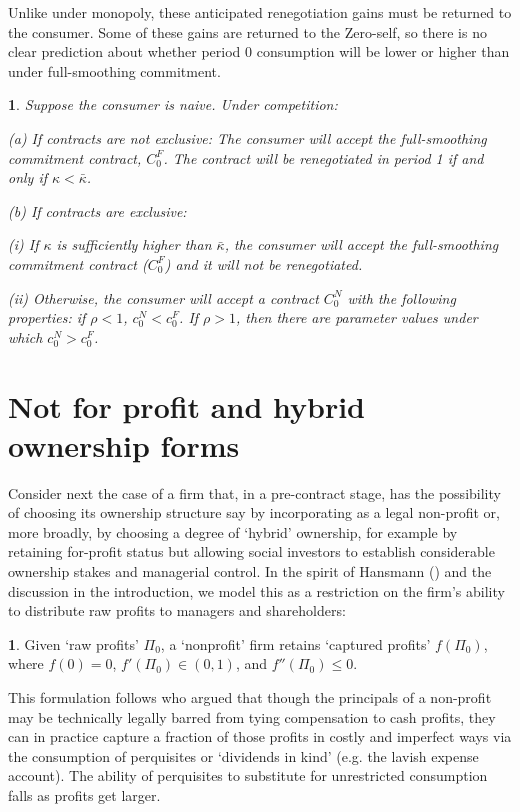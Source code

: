 \documentclass[11pt,english]{article}
\theoremstyle{plain}
\newtheorem{prop}{\protect\propositionname}
\theoremstyle{definition}
\newtheorem*{defn*}{\protect\definitionname}
\providecommand{\definitionname}{Definition}
\providecommand{\propositionname}{Proposition}
\begin{document}
Unlike under monopoly, these anticipated renegotiation gains must
be returned to the consumer. Some of these gains are returned to the
Zero-self, so there is no clear prediction about whether period 0
consumption will be lower or higher than under full-smoothing commitment.
\begin{prop}
Suppose the consumer is naive. Under competition:

(a) If contracts are not exclusive: The consumer will accept the full-smoothing
commitment contract, $C_{0}^{F}$. The contract will be renegotiated
in period 1 if and only if $\kappa<\bar{\kappa}$.

(b) If contracts are exclusive: 

(i) If $\kappa$ is sufficiently higher than $\bar{\kappa}$, the
consumer will accept the full-smoothing commitment contract ($C_{0}^{F}$)
and it will not be renegotiated. 

(ii) Otherwise, the consumer will accept a contract $C_{0}^{N}$ with
the following properties: if $\rho<1$, $c_{0}^{N}<c_{0}^{F}$. If
$\rho>1$, then there are parameter values under which $c_{0}^{N}>c_{0}^{F}$. 
\end{prop}

\section{Not for profit and hybrid ownership forms}

Consider next the case of a firm that, in a pre-contract stage, has
the possibility of choosing its ownership structure say by incorporating
as a legal non-profit or, more broadly, by choosing a degree of `hybrid'
ownership, for example by retaining for-profit status but allowing
social investors to establish considerable ownership stakes and managerial
control. In the spirit of Hansmann () and the discussion in the introduction,
we model this as a restriction on the firm's ability to distribute
raw profits to managers and shareholders:
\begin{defn*}
Given `raw profits' $\Pi_{0}$, a `nonprofit' firm retains `captured
profits' $f\left(\Pi_{0}\right)$, where $f\left(0\right)=0$, $f'\left(\Pi_{0}\right)\in\left(0,1\right)$,
and $f''\left(\Pi_{0}\right)\leq0.$ 
\end{defn*}
This formulation follows \citet{glaeser_not-for-profit_2001} who
argued that though the principals of a non-profit may be technically
legally barred from tying compensation to cash profits, they can in
practice capture a fraction of those profits in costly and imperfect
ways via the consumption of perquisites or `dividends in kind' (e.g.
the lavish expense account). The ability of perquisites to substitute
for unrestricted consumption falls as profits get larger. 
\end{document}
